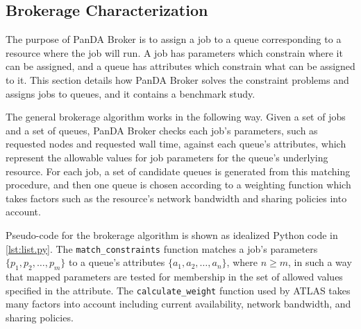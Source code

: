 \subsection{Brokerage Characterization}
\label{subsec:brokerage}

The purpose of PanDA Broker is to assign a job to a queue corresponding to a
resource where the job will run. A job has parameters which constrain where it
can be assigned, and a queue has attributes which constrain what can be
assigned to it. This section details how PanDA Broker solves the constraint
problems and assigns jobs to queues, and it contains a benchmark study.

The general brokerage algorithm works in the following way. Given a set of jobs
and a set of queues, PanDA Broker checks each job's parameters, such as
requested nodes and requested wall time, against each queue's attributes, which
represent the allowable values for job parameters for the queue's underlying
resource. For each job, a set of candidate queues is generated from this
matching procedure, and then one queue is chosen according to a weighting
function which takes factors such as the resource's network bandwidth and
sharing policies into account.

Pseudo-code for the brokerage algorithm is shown as idealized Python code in
\ref{lst:list.py}. The \texttt{match\_constraints} function matches a job's
parameters $\{p_1, p_2, \ldots, p_m\}$ to a queue's attributes $\{a_1, a_2,
\ldots, a_n\}$, where $n \geq m$, in such a way that mapped parameters are
tested for membership in the set of allowed values specified in the attribute.
The \texttt{calculate\_weight} function used by ATLAS takes many factors into
account including current availability, network bandwidth, and sharing policies.



